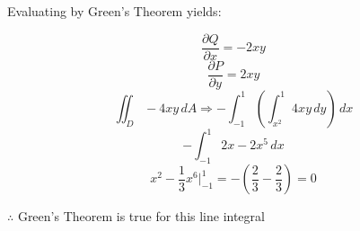\documentclass[12pt]{article}
\begin{document}
\begin{enumerate}
\begin{enumerate}
Evaluating by Green's Theorem yields:

$$\frac{\partial Q}{\partial x}=-2xy$$
$$\frac{\partial P}{\partial y}=2xy$$
$$\iint_D -4xy\,dA\Rightarrow-\int_{-1}^1\left(\int_{x^2}^1 4xy\,dy\right)\,dx$$
$$-\int_{-1}^1 2x-2x^5\,dx$$
$$x^2-\frac{1}{3}x^6\Big|_{-1}^1=-\left(\frac{2}{3}-\frac{2}{3}\right)=0$$
\begin{center} $\therefore$ Green's Theorem is true for this line integral \end{center}

      \end{enumerate}

	
\end{enumerate}
\end{document}
